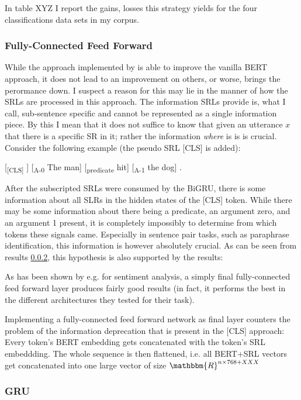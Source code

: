In table XYZ I report the gains, losses this strategy yields for the four classifications data sets
in my corpus.

\subsubsection{Fully-Connected Feed Forward}

While the approach implemented by \cite{zhang2019semantics} is able to improve the vanilla BERT
approach, it does not lead to an improvement on others, or worse, brings the perormance down. I
suspect a reason for this may lie in the manner of how the SRLs are processed in this approach.
The information SRLs provide is, what I call, sub-sentence specific and cannot be represented
as a single information piece. By this I mean that it does not suffice to know that given an
utterance $x$ that there is a specific SR in it; rather the information \emph{where} is is is
crucial. Consider the following example (the pseudo SRL [CLS] is added):


[\textsubscript{[CLS]} ] [\textsubscript{A-0} The man] [\textsubscript{predicate} hit] [\textsubscript{A-1} the dog] .

After the subscripted SRLs were consumed by the BiGRU, there is some information about all
SLRs in the hidden states of the [CLS] token. While there may be some information about there
being a predicate, an argument zero, and an argument 1 present, it is completely impossibly
to determine from which tokens these signals came. Especially in sentence pair tasks, such
as paraphrase identification, this information is however absolutely crucial. As can be seen
from results \ref{}, this hypothesis is also supported by the results:



As has been shown by e.g. \cite{myagmar2019transferable} for sentiment analysis, a simply final
fully-connected feed forward layer produces fairly good results (in fact, it performs the best
in the different architectures they tested for their task).

Implementing a fully-connected feed forward network as final layer counters the problem of the
information deprecation that is present in the [CLS] approach: Every token's BERT embedding gets
concatenated with the token's SRL embeddding. The whole sequence is then flattened, i.e. all
BERT+SRL vectors get concatenated into one large vector of size $\mathbbm{R}^{n\times768+XXX}$


\subsubsection{GRU}

